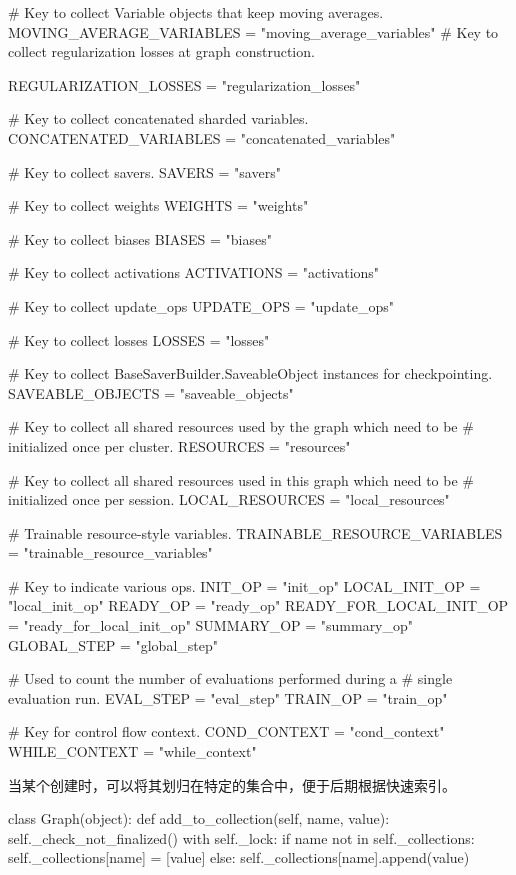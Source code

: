 \begin{content}
\begin{leftbar}
\begin{python}
  # Key to collect Variable objects that keep moving averages.
  MOVING_AVERAGE_VARIABLES = "moving_average_variables"
  # Key to collect regularization losses at graph construction.

  REGULARIZATION_LOSSES = "regularization_losses"

  # Key to collect concatenated sharded variables.
  CONCATENATED_VARIABLES = "concatenated_variables"

  # Key to collect savers.
  SAVERS = "savers"

  # Key to collect weights
  WEIGHTS = "weights"

  # Key to collect biases
  BIASES = "biases"

  # Key to collect activations
  ACTIVATIONS = "activations"

  # Key to collect update\_ops
  UPDATE_OPS = "update_ops"

  # Key to collect losses
  LOSSES = "losses"

  # Key to collect BaseSaverBuilder.SaveableObject instances for checkpointing.
  SAVEABLE_OBJECTS = "saveable_objects"

  # Key to collect all shared resources used by the graph which need to be
  # initialized once per cluster.
  RESOURCES = "resources"

  # Key to collect all shared resources used in this graph which need to be
  # initialized once per session.
  LOCAL_RESOURCES = "local_resources"

  # Trainable resource-style variables.
  TRAINABLE_RESOURCE_VARIABLES = "trainable_resource_variables"

  # Key to indicate various ops.
  INIT_OP = "init_op"
  LOCAL_INIT_OP = "local_init_op"
  READY_OP = "ready_op"
  READY_FOR_LOCAL_INIT_OP = "ready_for_local_init_op"
  SUMMARY_OP = "summary_op"
  GLOBAL_STEP = "global_step"

  # Used to count the number of evaluations performed during a 
  # single evaluation run.
  EVAL_STEP = "eval_step"
  TRAIN_OP = "train_op"

  # Key for control flow context.
  COND_CONTEXT = "cond_context"
  WHILE_CONTEXT = "while_context"
\end{python}
\end{leftbar}

当某个创建时，可以将其划归在特定的集合中，便于后期根据快速索引。

\begin{leftbar}
\begin{python}
class Graph(object):
  def add_to_collection(self, name, value):
    self._check_not_finalized()
    with self._lock:
      if name not in self._collections:
        self._collections[name] = [value]
      else:
        self._collections[name].append(value)
\end{python}
\end{leftbar}



\end{content}
